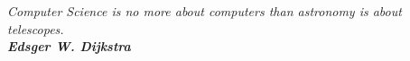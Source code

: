 \pagestyle{plain}
\vspace*{50mm}
\begin{flushright}
    \textit{Computer Science is no more about computers than astronomy is about telescopes.}\\
    \textit{\textbf{Edsger W. Dijkstra}}
\end{flushright}
